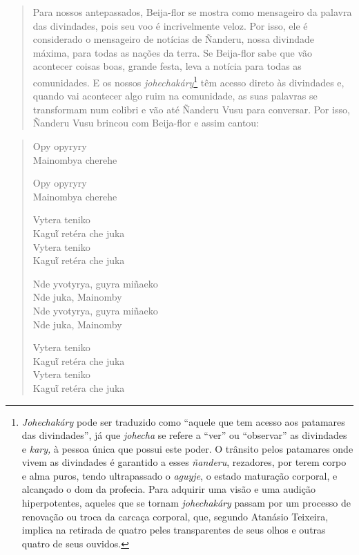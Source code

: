 \begin{quote}
Para nossos antepassados, Beija-flor se mostra como mensageiro da
palavra das divindades, pois seu voo é incrivelmente veloz. Por isso,
ele é considerado o mensageiro de notícias de Ñanderu, nossa divindade
máxima, para todas as nações da terra. Se Beija-flor sabe que vão
acontecer coisas boas, grande festa, leva a notícia para todas as
comunidades. E os nossos \emph{johechakáry}\footnote{\emph{Johechakáry}
  pode ser traduzido como ``aquele que tem acesso aos patamares das
  divindades'', já que \emph{johecha} se refere a ``ver'' ou
  ``observar'' as divindades e \emph{kary,} à pessoa única que possui
  este poder. O trânsito pelos patamares onde vivem as divindades é
  garantido a esses \emph{ñanderu}, rezadores, por terem corpo e alma
  puros, tendo ultrapassado o \emph{aguyje}, o estado maturação
  corporal, e alcançado o dom da profecia. Para adquirir uma visão e uma
  audição hiperpotentes, aqueles que se tornam \emph{johechakáry} passam
  por um processo de renovação ou troca da carcaça corporal, que,
  segundo Atanásio Teixeira, implica na retirada de quatro peles
  transparentes de seus olhos e outras quatro de seus ouvidos.} têm
acesso direto às divindades e, quando vai acontecer algo ruim na
comunidade, as suas palavras se transformam num colibri e vão até
Ñanderu Vusu para conversar. Por isso, Ñanderu Vusu brincou com
Beija-flor e assim cantou:
\end{quote}

\begin{verse}
Opy opyryry\\
Mainombya cherehe

Opy opyryry\\
Mainombya cherehe

Vytera teniko\\
Kaguῖ retéra che juka\footnotemark{}\\
Vytera teniko\\
Kaguῖ retéra che juka

Nde yvotyrya, guyra miñaeko\\
Nde juka, Mainomby\\
Nde yvotyrya, guyra miñaeko\\
Nde juka, Mainomby

Vytera teniko\\
Kaguῖ retéra che juka\\
Vytera teniko\\
Kaguῖ retéra che juka
\end{verse}

